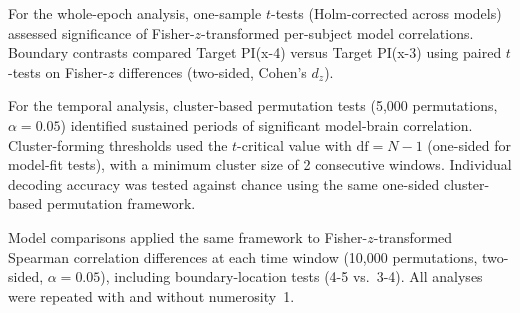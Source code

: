 For the whole-epoch analysis, one-sample $t$-tests (Holm-corrected
across models) assessed significance of Fisher-$z$-transformed
per-subject model correlations. Boundary contrasts compared Target
PI(x-4) versus Target PI(x-3) using paired $t$-tests on Fisher-$z$
differences (two-sided, Cohen's $d_z$).

For the temporal analysis, cluster-based permutation tests (5,000
permutations, $\alpha = 0.05$) identified sustained periods of
significant model-brain correlation. Cluster-forming thresholds used
the $t$-critical value with $\text{df} = N - 1$ (one-sided for
model-fit tests), with a minimum cluster size of 2 consecutive
windows. Individual decoding accuracy was tested against chance using
the same one-sided cluster-based permutation framework.

Model comparisons applied the same framework to
Fisher-$z$-transformed Spearman correlation differences at each time
window (10,000 permutations, two-sided, $\alpha = 0.05$), including
boundary-location tests (4-5 vs.\ 3-4). All analyses were repeated
with and without numerosity~1.
